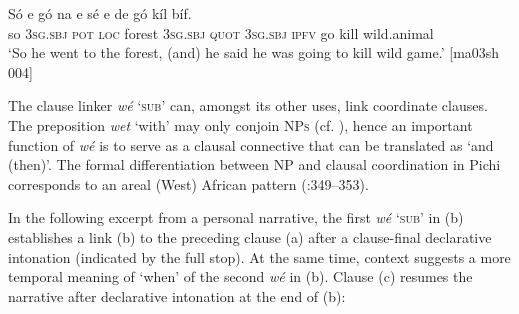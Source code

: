 \ea%
    \label{ex:key:1361}
    \gll Só  e    gó  na      e    sé    e    de
gó  kíl  bíf.\\
so  \textsc{3sg.sbj}  \textsc{pot}  \textsc{loc}  forest  \textsc{3sg.sbj}  \textsc{quot}    \textsc{3sg.sbj}  \textsc{ipfv}
go  kill  wild.animal\\

\glt ‘So he went to the forest, (and) he said he was going to kill
wild game.’ [ma03sh 004]
\z

The clause linker \textit{wé} ‘\textsc{sub}’ can, amongst its other uses, link coordinate clauses. The preposition \textit{wet} ‘with’ may only conjoin \textsc{NPs} (cf. ), hence an important function of \textit{wé} is to serve as a clausal connective that can be translated as ‘and (then)’. The formal differentiation between \textsc{NP} and clausal coordination in Pichi corresponds to an areal (West) African pattern (\citealt{Mithun1988}:349–353). 


In the following excerpt from a personal narrative, the first \textit{wé} ‘\textsc{sub}’ in (b) establishes a link (b) to the preceding clause (a) after a clause-final declarative intonation (indicated by the full stop). At the same time, context suggests a more temporal meaning of ‘when’ of the second \textit{wé} in (b). Clause (c) resumes the narrative after declarative intonation at the end of (b): 



\ea%
    \label{ex:key:1362}
\z\z

